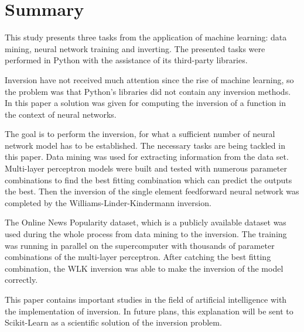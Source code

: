 \chapter{Summary}

This study presents three tasks from the application of machine learning: data mining, neural network training and inverting. The presented tasks were performed in Python with the assistance of its third-party libraries. \medskip

Inversion have not received much attention since the rise of machine learning, so the problem was that Python's libraries did not contain any inversion methods. In this paper a solution was given for computing the inversion of a function in the context of neural networks.\medskip

The goal is to perform the inversion, for what a sufficient number of neural network model has to be established. The necessary tasks are being tackled in this paper. Data mining was used for extracting information from the data set. Multi-layer perceptron models were built and tested with numerous parameter combinations to find the best fitting combination which can predict the outputs the best. Then the inversion of the single element feedforward neural network was completed by the Williams-Linder-Kindermann inversion.\medskip

The Online News Popularity dataset, which is a publicly available dataset was used during the whole process from data mining to the inversion. The training was running in parallel on the supercomputer with thousands of parameter combinations of the multi-layer perceptron. After catching the best fitting combination, the WLK inversion was able to make the inversion of the model correctly. \medskip

This paper contains important studies in the field of artificial intelligence with the implementation of inversion. In future plans, this explanation will be sent to Scikit-Learn as a scientific solution of the inversion problem.
